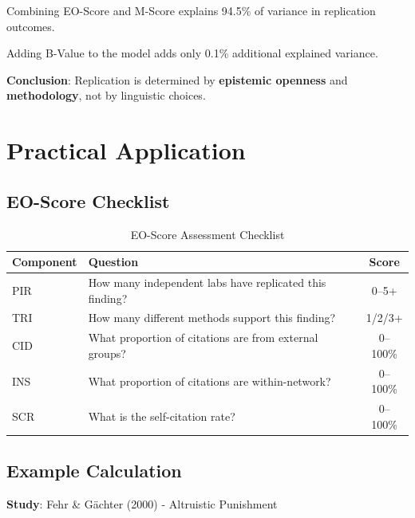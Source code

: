 \documentclass[11pt,a4paper]{article}
\begin{document}
\begin{resultbox}[title={EO and M Together}]
Combining EO-Score and M-Score explains 94.5\% of variance in replication outcomes.

Adding B-Value to the model adds only 0.1\% additional explained variance.

\textbf{Conclusion}: Replication is determined by \textbf{epistemic openness} and \textbf{methodology}, not by linguistic choices.
\end{resultbox}


\section{Practical Application}
\label{sec:application}

\subsection{EO-Score Checklist}

\begin{table}[h]
\centering
\caption{EO-Score Assessment Checklist}
\label{tab:checklist}
\begin{tabular}{lp{6cm}c}
\toprule
\textbf{Component} & \textbf{Question} & \textbf{Score} \\
\midrule
PIR & How many independent labs have replicated this finding? & 0--5+ \\
TRI & How many different methods support this finding? & 1/2/3+ \\
CID & What proportion of citations are from external groups? & 0--100\% \\
INS & What proportion of citations are within-network? & 0--100\% \\
SCR & What is the self-citation rate? & 0--100\% \\
\bottomrule
\end{tabular}
\end{table}

\subsection{Example Calculation}

\textbf{Study}: Fehr \& Gächter (2000) - Altruistic Punishment
\end{document}
